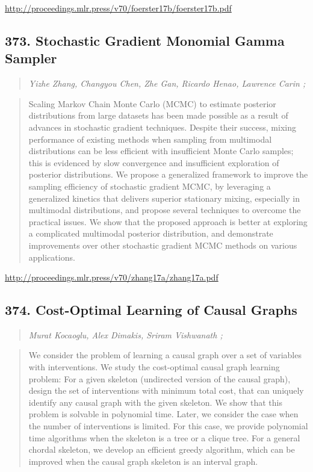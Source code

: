 \documentclass{article}
\begin{document}
\href{http://proceedings.mlr.press/v70/foerster17b/foerster17b.pdf}{http://proceedings.mlr.press/v70/foerster17b/foerster17b.pdf}

\subsection{373. Stochastic Gradient Monomial Gamma Sampler}

\begin{quote}
\footnotesize{\textit{Yizhe Zhang, Changyou Chen, Zhe Gan, Ricardo Henao, Lawrence Carin ;}}

\end{quote}

\begin{quote}
    Scaling Markov Chain Monte Carlo (MCMC) to estimate posterior distributions from large datasets has been made possible as a result of advances in stochastic gradient techniques. Despite their success, mixing performance of existing methods when sampling from multimodal distributions can be less efficient with insufficient Monte Carlo samples; this is evidenced by slow convergence and insufficient exploration of posterior distributions. We propose a generalized framework to improve the sampling efficiency of stochastic gradient MCMC, by leveraging a generalized kinetics that delivers superior stationary mixing, especially in multimodal distributions, and propose several techniques to overcome the practical issues. We show that the proposed approach is better at exploring a complicated multimodal posterior distribution, and demonstrate improvements over other stochastic gradient MCMC methods on various applications.  
\end{quote}

\href{http://proceedings.mlr.press/v70/zhang17a/zhang17a.pdf}{http://proceedings.mlr.press/v70/zhang17a/zhang17a.pdf}

\subsection{374. Cost-Optimal Learning of Causal Graphs}

\begin{quote}
\footnotesize{\textit{Murat Kocaoglu, Alex Dimakis, Sriram Vishwanath ;}}

\end{quote}

\begin{quote}
    We consider the problem of learning a causal graph over a set of variables with interventions. We study the cost-optimal causal graph learning problem: For a given skeleton (undirected version of the causal graph), design the set of interventions with minimum total cost, that can uniquely identify any causal graph with the given skeleton. We show that this problem is solvable in polynomial time. Later, we consider the case when the number of interventions is limited. For this case, we provide polynomial time algorithms when the skeleton is a tree or a clique tree. For a general chordal skeleton, we develop an efficient greedy algorithm, which can be improved when the causal graph skeleton is an interval graph.  
\end{quote}
\end{document}
